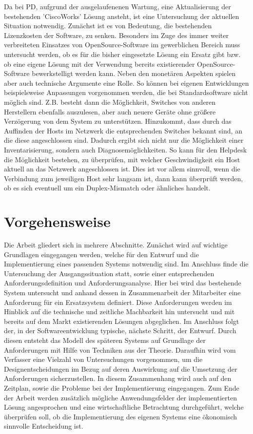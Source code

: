 Da bei PD, aufgrund der ausgelaufenenen Wartung, eine Aktualisierung der bestehenden 'CiscoWorks' Lösung ansteht, ist eine Untersuchung der aktuellen Situation notwendig.
Zunächst ist es von Bedeutung, die bestehenden Lizenzkosten der Software, zu senken.
Besonders im Zuge des immer weiter verbreiteten Einsatzes von OpenSource-Software im gewerblichen Bereich muss untersucht werden, ob es für die bisher eingesetzte Lösung ein Ersatz gibt bzw. ob eine eigene Lösung mit der Verwendung bereits existierender OpenSource-Software bewerkstelligt werden kann.
Neben den monetären Aspekten spielen aber auch technische Argumente eine Rolle.
So können bei eigenen Entwicklungen beispielsweise Anpassungen vorgenommen werden, die bei Standardsoftware nicht möglich sind.
Z.B. besteht dann die Möglichkeit, Switches von anderen Herstellern ebenfalls auszulesen, aber auch neuere Geräte ohne größere Verzögerung von dem System zu unterstützen.
Hinzukommt, dass durch das Auffinden der Hosts im Netzwerk die entsprechenden Switches bekannt sind, an die diese angeschlossen sind. Dadurch ergibt sich nicht nur die Möglichkeit einer Inventarisierung, sondern auch Diagnosemöglichkeiten. So kann für den Helpdesk die Möglichkeit bestehen, zu überprüfen, mit welcher Geschwindigkeit ein Host aktuell an das Netzwerk angeschlossen ist.
Dies ist vor allem sinnvoll, wenn die Verbindung zum jeweiligen Host sehr langsam ist, dann kann überprüft werden, ob es sich eventuell um ein Duplex-Mismatch oder ähnliches handelt.


\section{Vorgehensweise}

Die Arbeit gliedert sich in mehrere Abschnitte.
Zunächst wird auf wichtige Grundlagen eingegangen werden, welche für den Entwurf und die Implementierung eines passenden Systems notwendig sind.
Im Anschluss finde die Untersuchung der Ausgangssituation statt, sowie einer entsprechenden Anforderungsdefinition und Anforderungsanalyse.
Hier bei wird das bestehende System untersucht und anhand dessen in Zusammenarbeit der Mitarbeiter eine Anforderung für ein Ersatzsystem definiert.
Diese Anforderungen werden im Hinblick auf die technische und zeitliche Machbarkeit hin untersucht und mit bereits auf dem Markt existierenden Lösungen abgeglichen.
Im Anschluss folgt der, in der Softwareentwicklung typische, nächste Schritt, der Entwurf.
Durch diesen entsteht das Modell des späteren Systems auf Grundlage der Anforderungen mit Hilfe von Techniken aus der Theorie.
Daraufhin wird vom Verfasser eine Vielzahl von Untersuchungen vorgenommen, um die Designentscheidungen im Bezug auf deren Auswirkung auf die Umsetzung der Anforderungen sicherzustellen.
In diesem Zusammenhang wird auch auf den Zeitplan, sowie die Probleme bei der Implementierung eingegangen.
Zum Ende der Arbeit werden zusätzlich mögliche Anwendungsfelder der implementierten Lösung angesprochen und eine wirtschaftliche Betrachtung durchgeführt, welche überprüfen soll, ob die Implementierung des eigenen Systems eine ökonomisch sinnvolle Entscheidung ist.\\